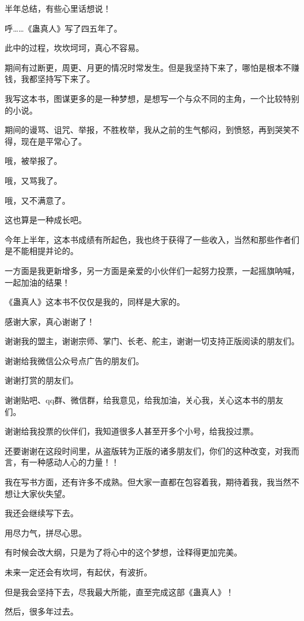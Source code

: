 \begin{this_body}
半年总结，有些心里话想说！

呼……《蛊真人》写了四五年了。

此中的过程，坎坎坷坷，真心不容易。

期间有过断更，周更、月更的情况时常发生。但是我坚持下来了，哪怕是根本不赚钱，我都坚持写下来了。

我写这本书，图谋更多的是一种梦想，是想写一个与众不同的主角，一个比较特别的小说。

期间的谩骂、诅咒、举报，不胜枚举，我从之前的生气郁闷，到愤怒，再到哭笑不得，现在是平常心了。

哦，被举报了。

哦，又骂我了。

哦，又不满意了。

这也算是一种成长吧。

今年上半年，这本书成绩有所起色，我也终于获得了一些收入，当然和那些作者们是不能相提并论的。

一方面是我更新增多，另一方面是亲爱的小伙伴们一起努力投票，一起摇旗呐喊，一起加油的结果！

《蛊真人》这本书不仅仅是我的，同样是大家的。

感谢大家，真心谢谢了！

谢谢我的盟主，谢谢宗师、掌门、长老、舵主，谢谢一切支持正版阅读的朋友们。

谢谢给我微信公众号点广告的朋友们。

谢谢打赏的朋友们。

谢谢贴吧、qq群、微信群，给我意见，给我加油，关心我，关心这本书的朋友们。

谢谢给我投票的伙伴们，我知道很多人甚至开多个小号，给我投过票。

还要谢谢在这段时间里，从盗版转为正版的诸多朋友们，你们的这种改变，对我而言，有一种感动人心的力量！！

我在写书方面，还有许多不成熟。但大家一直都在包容着我，期待着我，我当然不想让大家伙失望。

我还会继续写下去。

用尽力气，拼尽心思。

有时候会改大纲，只是为了将心中的这个梦想，诠释得更加完美。

未来一定还会有坎坷，有起伏，有波折。

但是我会坚持下去，尽我最大所能，直至完成这部《蛊真人》！

然后，很多年过去。


\end{this_body}
